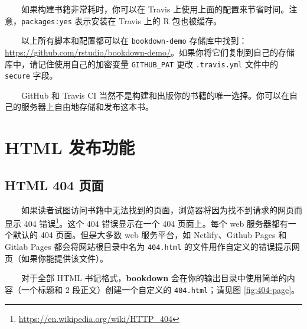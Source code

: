 \documentclass[
  12pt,
]{krantz}
\newenvironment{Shaded}{\begin{snugshade}}{\end{snugshade}}
\newcommand{\AttributeTok}[1]{\textcolor[rgb]{0.77,0.63,0.00}{#1}}
\newcommand{\CharTok}[1]{\textcolor[rgb]{0.31,0.60,0.02}{#1}}
\newcommand{\FunctionTok}[1]{\textcolor[rgb]{0.00,0.00,0.00}{#1}}
\newcommand{\KeywordTok}[1]{\textcolor[rgb]{0.13,0.29,0.53}{\textbf{#1}}}
\renewcommand{\href}[2]{#2\footnote{\url{#1}}}
\theoremstyle{definition}
\theoremstyle{definition}
\theoremstyle{definition}
\theoremstyle{definition}
\theoremstyle{remark}
\begin{document}
\begin{Shaded}
\end{Shaded}

  如果构建书籍非常耗时，你可以在 Travis 上使用上面的配置来节省时间。注意，\texttt{packages:yes} 表示安装在 Travis 上的 R 包也被缓存。

  以上所有脚本和配置都可以在 \texttt{bookdown-demo} 存储库中找到：\url{https://github.com/rstudio/bookdown-demo/}。如果你将它们复制到自己的存储库中，请记住使用自己的加密变量 \texttt{GITHUB\_PAT} 更改 \texttt{.travis.yml} 文件中的 \texttt{secure} 字段。

  GitHub 和 Travis CI 当然不是构建和出版你的书籍的唯一选择。你可以在自己的服务器上自由地存储和发布这本书。

\hypertarget{html-ux53d1ux5e03ux529fux80fd}{%
\section{HTML 发布功能}\label{html-ux53d1ux5e03ux529fux80fd}}

\hypertarget{html-404}{%
\subsection{HTML 404 页面}\label{html-404}}

  如果读者试图访问书籍中无法找到的页面，浏览器将因为找不到请求的网页而显示 \href{https://en.wikipedia.org/wiki/HTTP_404}{404 错误}。这个 404 错误显示在一个 404 页面上。每个 web 服务器都有一个默认的 404 页面。但是大多数 web 服务平台，如 Netlify、Github Pages 和 Gitlab Pages 都会将网站根目录中名为 \texttt{404.html} 的文件用作自定义的错误提示网页（如果你能提供该文件）。

  对于全部 HTML 书记格式，\textbf{bookdown} 会在你的输出目录中使用简单的内容（一个标题和 2 段正文）创建一个自定义的 \texttt{404.html}；请见图 \ref{fig:404-page}。
\end{document}
